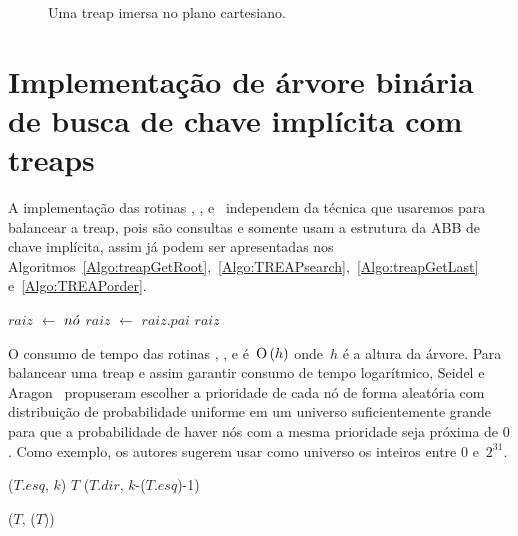 \begin{figure}[htb]
\centering

\caption{Uma treap imersa no plano cartesiano.}
\label{fig:TREAP}
\end{figure}

\section{Implementação de árvore binária de busca de chave implícita com treaps}
\label{sec:imple-treap}
A implementação das rotinas \treapGetRoot{}, \treapSearch{}, \treapOrder{} e~\treapGetLast{} independem da técnica que usaremos para balancear a treap, pois são consultas e somente usam a estrutura da ABB de chave implícita, assim já podem ser apresentadas nos Algoritmos~\ref{Algo:treapGetRoot},~\ref{Algo:TREAPsearch},~\ref{Algo:treapGetLast} e~\ref{Algo:TREAPorder}.

\begin{algorithm}[htb]
\caption{\treapGetRoot($\node$)}
\label{Algo:treapGetRoot}
\begin{algorithmic}[1]
\State $raiz$ $\gets$ $\node$
\State  $raiz$ $\gets$  $raiz$.$pai$
\EndWhile
\State \Return $raiz$
\end{algorithmic}
\end{algorithm}

O consumo de tempo das rotinas \treapGetRoot{}, \treapSearch{}, \treapGetLast{} e \treapOrder{} é~$\text{O}\left(h\right)$ onde~$h$ é a altura da árvore. Para balancear uma treap e assim garantir consumo de tempo logarítmico, Seidel e Aragon~\cite{AragonSeidel1996} propuseram escolher a prioridade de cada nó de forma aleatória com distribuição de probabilidade uniforme em um universo suficientemente grande para que a probabilidade de haver nós com a mesma prioridade seja próxima de $0$. Como exemplo, os autores sugerem usar como universo os inteiros entre $0$ e~$2^{31}$.

\begin{algorithm}
\caption{\treapSearch($T$, $k$)}
\label{Algo:TREAPsearch}
\begin{algorithmic}[1]
\State \Return \treapSearch($T$.$esq$, $k$)
\EndIf
{}
\State \Return $T$
\EndIf
\State \Return \treapSearch($T.dir$, $k$-\treapGetSize($T$.$esq$)-1)
\end{algorithmic}
\end{algorithm}

\begin{algorithm}
\caption{\treapGetLast($T$)}
\label{Algo:treapGetLast}
\begin{algorithmic}[1]
\State \Return \treapSearch($T$, \treapGetSize($T$))
\end{algorithmic}
\end{algorithm}

